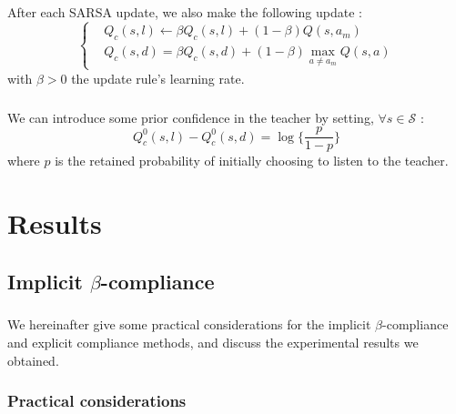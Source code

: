 \documentclass[a4paper]{report}
\begin{document}
{{{{			\paragraph{} After each SARSA update, we also make the following update : 
			\begin{equation}
				\label{eq::av_update_rule}
				\left\{
				\begin{aligned}
					&Q_c(s,l) \leftarrow  \beta Q_c(s,l) + (1-\beta)Q(s,a_m) \\
					&Q_c(s,d) = \beta Q_c(s,d) + (1-\beta)\max_{a\neq a_m} Q(s,a) 
				\end{aligned}
				\right.
			\end{equation}
			with $\beta >0$ the update rule's learning rate. 
			\paragraph{} We can introduce some prior confidence in the teacher by setting, $\forall s\in\mathcal{S}$ : 
			\begin{equation}
				Q^0_c(s,l) - Q^0_c(s,d) = \log\{\frac{p}{1-p}\}
			\end{equation}
			where $p$ is the retained probability of initially choosing to listen to the teacher. 
			}
		}	
	}
	
	\chapter{Results}
	{
		\label{chap::res}
	
		\section{Implicit $\beta$-compliance}
		{
			\paragraph{} We hereinafter give some practical considerations for the implicit $\beta$-compliance and explicit compliance methods, and discuss the experimental results we obtained. 
			\subsection{Practical considerations}
			{
}}}}
\end{document}
